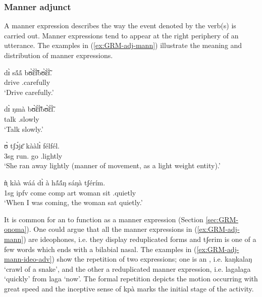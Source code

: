 \begin{exe}
\begin{exe}
\begin{exe}
\subsubsection{Manner adjunct}
\label{sec:GRM-manner-adv}

A manner  expression describes the way the event denoted by the verb(s) is carried out. Manner expressions tend to appear at the right periphery of an utterance. The examples in (\ref{ex:GRM-adj-mann}) illustrate the meaning and distribution of  manner expressions.

\ea\label{ex:GRM-adj-mann}

\ea\label{ex:GRM-adj-mann-carefully}
\gll dɪ̀ sã́ã́ bʊ̃̀ɛ̃̀ɪ̃̀bʊ̃̀ɛ̃̀ɪ̃̀.\\
{\comp} drive {\ideo}.carefully\\
\glt `Drive carefully.'

\ex\label{ex:GRM-adj-mann-slowly}
\gll dɪ̀ ŋmà bʊ̃̀ɛ̃̀ɪ̃̀bʊ̃̀ɛ̃̀ɪ̃̀.\\
{\comp} talk {\ideo}.slowly\\
\glt `Talk slowly.'

\ex\label{ex:GRM-adj-mann-lighly}
\gll ʊ̀ tʃɔ́jɛ̄ kààlɪ̀ félfél.\\
 {\sc 3sg} run.{\pfv} go {\ideo}.lightly\\
\glt `She ran away lightly (manner of movement, as a light weight
entity).'

\ex\label{ex:GRM-adj-mann-silently}
\gll  ǹ̩ kàà wáá dɪ̀ à   hã́ã́ŋ  sáŋà   tʃérím.\\
{\sc 1sg} {\sc ipfv} come {\sc comp} {\sc art} woman sit {\ideo}.quietly\\
\glt `When I was coming, the woman sat quietly.' 
\z 
 \z

It is common for an  to function as a manner expression 
 (Section \ref{sec:GRM-onoma}). One could argue that  all the manner expressions in 
(\ref{ex:GRM-adj-mann}) are ideophones, i.e. they display reduplicated forms and {\sls tʃerim} is 
one of a few words which ends with a bilabial nasal. The examples in 
(\ref{ex:GRM-adj-mann-ideo-adv}) show the repetition of two expressions; one is an 
, i.e. {\sls kaŋkalaŋ} `crawl of a snake', and the other  a  reduplicated  
manner expression,  i.e. {\sls  lagalaga} `quickly' from {\sls laga} `now'.  The formal 
repetition depicts  the motion occurring with great speed  and the inceptive sense  of  {\sls 
kpà}  marks the initial stage of the activity.



\end{exe}
\end{exe}
\end{exe}
